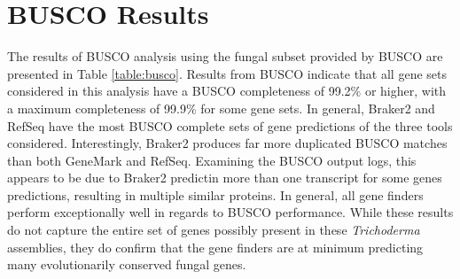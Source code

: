 \section{BUSCO Results}

The results of BUSCO analysis using the fungal subset provided by
BUSCO are presented in Table \ref{table:busco}. Results from BUSCO
indicate that all gene sets considered in this analysis have a BUSCO
completeness of 99.2\% or higher, with a maximum completeness of
99.9\% for some gene sets. In general, Braker2 and RefSeq have the
most BUSCO complete sets of gene predictions of the three tools
considered. Interestingly, Braker2 produces far more duplicated BUSCO
matches than both GeneMark and RefSeq. Examining the BUSCO output
logs, this appears to be due to Braker2 predictin more than one
transcript for some genes predictions, resulting in multiple similar
proteins. In general, all gene finders perform exceptionally well in
regards to BUSCO performance. While these results do not capture the
entire set of genes possibly present in these \textit{Trichoderma}
assemblies, they do confirm that the gene finders are at minimum
predicting many evolutionarily conserved fungal genes.

